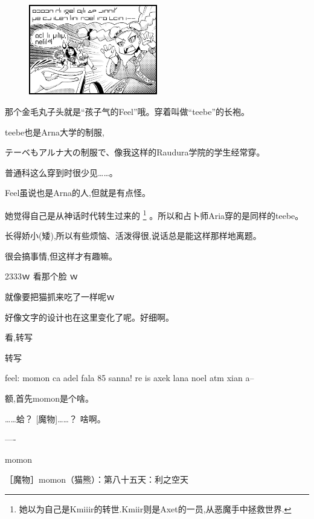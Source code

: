 


\begin{figure}[H]
\includegraphics[width=0.5\textwidth]{ARKA/uni4.png}%
\end{figure}


那个金毛丸子头就是``孩子气的Feel''哦。穿着叫做``teebe''的长袍。


teebe也是Arna大学的制服,

テーベもアルナ大の制服で、像我这样的Raudura学院的学生经常穿。

普通科这么穿到时很少见……。


Feel虽说也是Arna的人,但就是有点怪。

她觉得自己是从神话时代转生过来的
\footnote{她以为自己是Kmiiir的转世.Kmiir则是Axet的一员,从恶魔手中拯救世界.}
。所以和占卜师Aria穿的是同样的teebe。

长得娇小(矮),所以有些烦恼、活泼得很,说话总是能这样那样地离题。

很会搞事情,但这样才有趣嘛。


2333ｗ  看那个脸 ｗ

就像要把猫抓来吃了一样呢ｗ

好像文字的设计也在这里变化了呢。好细啊。


看,转写

\FiveStar 转写

feel: momon ca adel fala 85 sanna! re is axek lana noel atm xian a--


额,首先momon是个啥。
    
……蛤？  [魔物]……？  啥啊。

----

momon

［魔物］momon（猫熊）：第八十五天：利之空天

